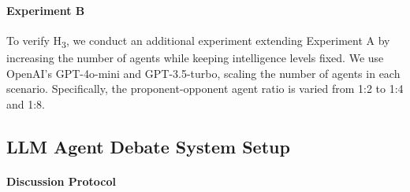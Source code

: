 \documentclass[11pt]{article}
\begin{document}
\paragraph{Experiment B}
To verify H\textsubscript{3}, we conduct an additional experiment extending Experiment A by increasing the number of agents while keeping intelligence levels fixed. We use OpenAI's GPT-4o-mini and GPT-3.5-turbo, scaling the number of agents in each scenario. Specifically, the proponent-opponent agent ratio is varied from 1:2 to 1:4 and 1:8.



\subsection{LLM Agent Debate System Setup} 

\paragraph{Discussion Protocol}


\end{document}
